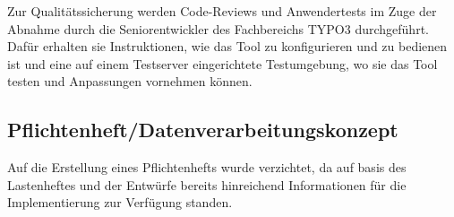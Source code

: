 Zur Qualitätssicherung werden Code-Reviews und Anwendertests im Zuge der Abnahme durch die Seniorentwickler des Fachbereichs TYPO3 durchgeführt. Dafür erhalten sie Instruktionen, wie das Tool zu konfigurieren und zu bedienen ist und eine auf einem Testserver eingerichtete Testumgebung, wo sie das Tool testen und Anpassungen vornehmen können.


\subsection{Pflichtenheft/Datenverarbeitungskonzept}
\label{sec:Pflichtenheft}

Auf die Erstellung eines Pflichtenhefts wurde verzichtet, da auf basis des Lastenheftes und der Entwürfe bereits hinreichend Informationen für die Implementierung zur Verfügung standen.